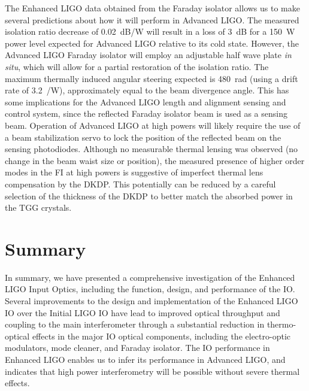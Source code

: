The Enhanced LIGO data obtained from the Faraday isolator allows us to
make several predictions about how it will perform in Advanced LIGO.
The measured isolation ratio decrease of 0.02~dB/W will result in a
loss of 3~dB for a 150~W power level expected for Advanced LIGO
relative to its cold state.  However, the Advanced LIGO Faraday
isolator will employ an adjustable half wave plate \emph{in situ},
which will allow for a partial restoration of the isolation ratio. The
maximum thermally induced angular steering expected is 480~\micro rad
(using a drift rate of 3.2~\microrad/W), approximately equal to the
beam divergence angle. This has some implications for the Advanced
LIGO length and alignment sensing and control system, since the
reflected Faraday isolator beam is used as a sensing beam. Operation
of Advanced LIGO at high powers will likely require the use of a beam
stabilization servo to lock the position of the reflected beam on the
sensing photodiodes.  Although no measurable thermal lensing was
observed (no change in the beam waist size or position), the measured
presence of higher order modes in the FI at high powers is suggestive
of imperfect thermal lens compensation by the DKDP.  This potentially
can be reduced by a careful selection of the thickness of the DKDP to
better match the absorbed power in the TGG crystals.

\section{Summary}
\label{sec:summary}
In summary, we have presented a comprehensive investigation of the
Enhanced LIGO Input Optics, including the function, design, and
performance of the IO.  Several improvements to the design and
implementation of the Enhanced LIGO IO over the Initial LIGO IO have
lead to improved optical throughput and coupling to the main
interferometer through a substantial reduction in thermo-optical
effects in the major IO optical components, including the
electro-optic modulators, mode cleaner, and Faraday isolator.  The IO
performance in Enhanced LIGO enables us to infer its performance in
Advanced LIGO, and indicates that high power interferometry will be
possible without severe thermal effects.



